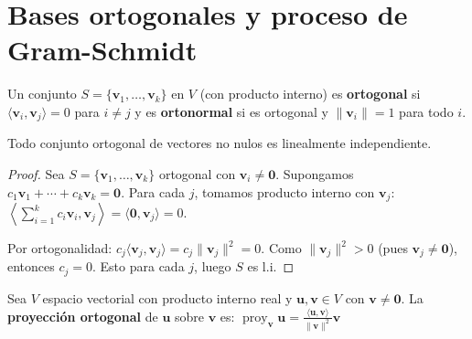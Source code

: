 \section{Bases ortogonales y proceso de Gram-Schmidt}

\begin{definition}
Un conjunto $S = \{ \mathbf{v}_1, \dots, \mathbf{v}_k \}$ en $V$ (con producto interno) es \textbf{ortogonal} si $\langle \mathbf{v}_i, \mathbf{v}_j \rangle = 0$ para $i \neq j$ y es \textbf{ortonormal} si es ortogonal y $\|\mathbf{v}_i\| = 1$ para todo $i.$
\end{definition}

\begin{theorem}
Todo conjunto ortogonal de vectores no nulos es linealmente independiente.
\end{theorem}

\begin{proof}
Sea $S = \{ \mathbf{v}_1, \dots, \mathbf{v}_k \}$ ortogonal con $\mathbf{v}_i \neq \mathbf{0}$. Supongamos \(
c_1 \mathbf{v}_1 + \cdots + c_k \mathbf{v}_k = \mathbf{0}
.\) Para cada $j$, tomamos producto interno con $\mathbf{v}_j$: \(
\left\langle \sum_{i=1}^k c_i \mathbf{v}_i, \mathbf{v}_j \right\rangle = \langle \mathbf{0}, \mathbf{v}_j \rangle = 0.
\)

Por ortogonalidad: \(
c_j \langle \mathbf{v}_j, \mathbf{v}_j \rangle = c_j \|\mathbf{v}_j\|^2 = 0
.\) Como $\|\mathbf{v}_j\|^2 > 0$ (pues $\mathbf{v}_j \neq \mathbf{0}$), entonces $c_j = 0$. Esto para cada $j$, luego $S$ es l.i.
\end{proof}


\begin{definition}
Sea $V$ espacio vectorial con producto interno real y $\mathbf{u}, \mathbf{v} \in V$ con $\mathbf{v} \neq \mathbf{0}$. La \textbf{proyección ortogonal} de $\mathbf{u}$ sobre $\mathbf{v}$ es: \(
\operatorname{proy}_{\mathbf{v}} \mathbf{u} = \frac{\langle \mathbf{u}, \mathbf{v} \rangle}{\|\mathbf{v}\|^2} \mathbf{v}
\)
\end{definition}

